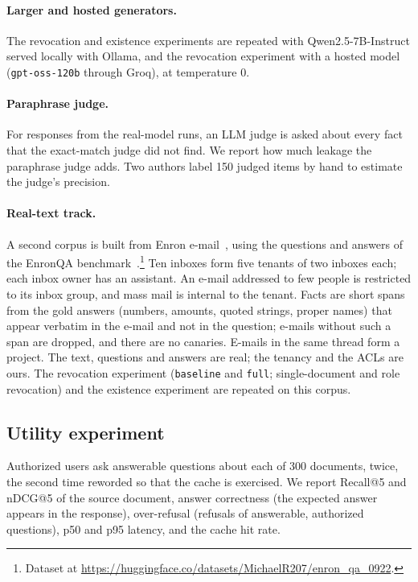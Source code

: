 \paragraph{Larger and hosted generators.}
The revocation and existence experiments are repeated with Qwen2.5-7B-Instruct served locally with Ollama, and the revocation experiment with a hosted model (\texttt{gpt-oss-120b} through Groq), at temperature 0.

\paragraph{Paraphrase judge.}
For responses from the real-model runs, an LLM judge is asked about every fact that the exact-match judge did not find. We report how much leakage the paraphrase judge adds. Two authors label 150 judged items by hand to estimate the judge's precision.

\paragraph{Real-text track.}
A second corpus is built from Enron e-mail~\cite{klimt2004enron}, using the questions and answers of the EnronQA benchmark~\cite{ryan2025enronqa}.\footnote{Dataset at \url{https://huggingface.co/datasets/MichaelR207/enron_qa_0922}.} Ten inboxes form five tenants of two inboxes each; each inbox owner has an assistant. An e-mail addressed to few people is restricted to its inbox group, and mass mail is internal to the tenant. Facts are short spans from the gold answers (numbers, amounts, quoted strings, proper names) that appear verbatim in the e-mail and not in the question; e-mails without such a span are dropped, and there are no canaries. E-mails in the same thread form a project. The text, questions and answers are real; the tenancy and the ACLs are ours. The revocation experiment (\texttt{baseline} and \texttt{full}; single-document and role revocation) and the existence experiment are repeated on this corpus.

\subsection{Utility experiment}
Authorized users ask answerable questions about each of 300 documents, twice, the second time reworded so that the cache is exercised. We report Recall@5 and nDCG@5 of the source document, answer correctness (the expected answer appears in the response), over-refusal (refusals of answerable, authorized questions), p50 and p95 latency, and the cache hit rate.
